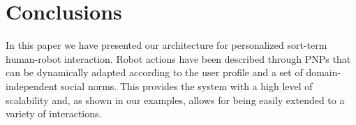 \vspace{-0.2cm}
\section{Conclusions}
\vspace{-0.1cm}
In this paper we have presented our architecture for personalized
sort-term human-robot interaction. Robot actions have been described
through PNPs that can be dynamically adapted according to the user
profile and a set of domain-independent social norms. This provides
the system with a high level of scalability and, as shown in our
examples, allows for being easily extended to a variety of interactions.


